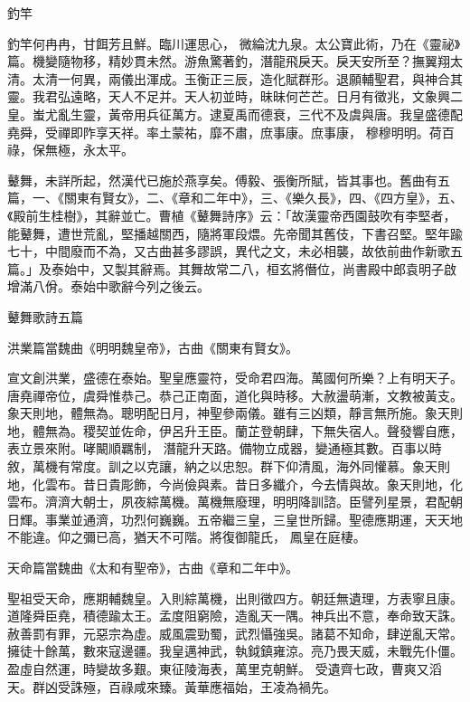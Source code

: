 \begin{pinyinscope}
 釣竿



 釣竿何冉冉，甘餌芳且鮮。臨川運思心，
 微綸沈九泉。太公寶此術，乃在《靈祕》篇。機變隨物移，精妙貫未然。游魚驚著釣，潛龍飛戾天。戾天安所至？撫翼翔太清。太清一何異，兩儀出渾成。玉衡正三辰，造化賦群形。退願輔聖君，與神合其靈。我君弘遠略，天人不足并。天人初並時，昧昧何芒芒。日月有徵兆，文象興二皇。蚩尤亂生靈，黃帝用兵征萬方。逮夏禹而德衰，三代不及虞與唐。我皇盛德配堯舜，受禪即阼享天祥。率土蒙祐，靡不肅，庶事康。庶事康，
 穆穆明明。荷百祿，保無極，永太平。



 鼙舞，未詳所起，然漢代已施於燕享矣。傅毅、張衡所賦，皆其事也。舊曲有五篇，一、《關東有賢女》，二、《章和二年中》，三、《樂久長》，四、《四方皇》，五、《殿前生桂樹》，其辭並亡。曹植《鼙舞詩序》云：「故漢靈帝西園鼓吹有李堅者，能鼙舞，遭世荒亂，堅播越關西，隨將軍段煨。先帝聞其舊伎，下書召堅。堅年踰七十，中間廢而不為，又古曲甚多謬誤，異代之文，未必相襲，故依前曲作新歌五篇。」及泰始中，又製其辭焉。其舞故常二八，桓玄將僭位，尚書殿中郎袁明子啟增滿八佾。泰始中歌辭今列之後云。



 鼙舞歌詩五篇



 洪業篇當魏曲《明明魏皇帝》，古曲《關東有賢女》。



 宣文創洪業，盛德在泰始。聖皇應靈符，受命君四海。萬國何所樂？上有明天子。唐堯禪帝位，虞舜惟恭己。恭己正南面，道化與時移。大赦盪萌漸，文教被黃支。象天則地，體無為。聰明配日月，神聖參兩儀。雖有三凶類，靜言無所施。象天則地，體無為。稷契並佐命，伊呂升王臣。蘭芷登朝肆，下無失宿人。聲發響自應，表立景來附。哮闞順羈制，
 潛龍升天路。備物立成器，變通極其數。百事以時敘，萬機有常度。訓之以克讓，納之以忠恕。群下仰清風，海外同懽慕。象天則地，化雲布。昔日貴彫飾，今尚儉與素。昔日多纖介，今去情與故。象天則地，化雲布。濟濟大朝士，夙夜綜萬機。萬機無廢理，明明降訓諮。臣譬列星景，君配朝日輝。事業並通濟，功烈何巍巍。五帝繼三皇，三皇世所歸。聖德應期運，天天地不能違。仰之彌已高，猶天不可階。將復御龍氏，
 鳳皇在庭棲。



 天命篇當魏曲《太和有聖帝》，古曲《章和二年中》。



 聖祖受天命，應期輔魏皇。入則綜萬機，出則徵四方。朝廷無遺理，方表寧且康。道隆舜臣堯，積德踰太王。孟度阻窮險，造亂天一隅。神兵出不意，奉命致天誅。赦善罰有罪，元惡宗為虛。威風震勁蜀，武烈懾強吳。諸葛不知命，肆逆亂天常。擁徒十餘萬，數來寇邊疆。我皇邁神武，執鉞鎮雍涼。亮乃畏天威，未戰先仆僵。盈虛自然運，時變故多艱。東征陵海表，萬里克朝鮮。
 受遺齊七政，曹爽又滔天。群凶受誅殛，百祿咸來臻。黃華應福始，王凌為禍先。




\end{pinyinscope}
